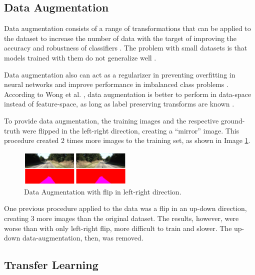 \documentclass[10pt,twocolumn,letterpaper]{article}
\begin{document}
\subsection{Data Augmentation} \label{ssec:data_augmentation}

Data augmentation consists of a range of transformations that can be applied to the dataset to increase the number of data with the target of improving the accuracy and robustness of classifiers \cite{AUGM_ADAPT}. The problem with small datasets is that models trained with them do not generalize well \cite{AUGM_DEEP}.

Data augmentation also can act as a regularizer in preventing overfitting in neural networks and improve performance in imbalanced class problems \cite{DATA_AUGM}. According to Wong et al. \cite{DATA_AUGM}, data augmentation is better to perform in data-space instead of feature-space, as long as label preserving transforms are known \cite{DATA_AUGM}.

To provide data augmentation, the training images and the respective ground-truth were flipped in the left-right direction, creating a ``mirror'' image. This procedure created 2 times more images to the training set, as shown in Image \ref{fig:data_augmentation}. 

\begin{figure}[ht]
  \centering
  \includegraphics[width=0.48\textwidth]{data_augmentation.png}
  \caption{Data Augmentation with flip in left-right direction.}
  \label{fig:data_augmentation}
\end{figure}

One previous procedure applied to the data was a flip in an up-down direction, creating 3 more images than the original dataset. The results, however, were worse than with only left-right flip, more difficult to train and slower. The up-down data-augmentation, then, was removed.

\subsection{Transfer Learning} \label{ssec:transfer_learning}
\end{document}
